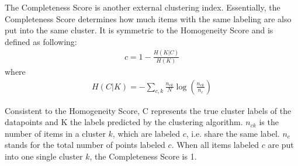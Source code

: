 The Completeness Score is another external clustering index. Essentially, the Completeness Score determines how much items with the same labeling are also put into the same cluster. It is symmetric to the Homogeneity Score and is defined as following: \cite{rosenberg2007v}
\begin{align}
    c = 1 - \frac{H(K|C)}{H(K)}  
\end{align}
where
\begin{align}
    H(C|K) = - \sum_{c,k} \frac{n_{ck}}{N}\log\left(\frac{n_{ck}}{n_c}\right)  
\end{align}


Consistent to the Homogeneity Score, C represents the true cluster labels of the datapoints and K the labels predicted by the clustering algorithm. $n_{ck}$ is the number of items in a cluster $k$, which are labeled $c$, i.e. share the same label. $n_c$ stands for the total number of points labeled $c$.
When all items labeled $c$ are put into one single cluster $k$, the Completeness Score is 1.